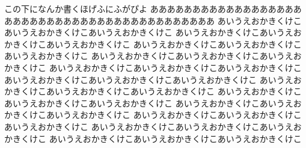 \documentclass[uplatex,dvipdfmx,ja=standard,a4paper]{bxjsarticle}
\begin{document}
この下になんか書くほげふにふがぴよ
ああああああああああああああああああ
あああああああああああああああああああああああああ
あいうえおかきくけこあいうえおかきくけこあいうえおかきくけこ
あいうえおかきくけこあいうえおかきくけこあいうえおかきくけこ
あいうえおかきくけこあいうえおかきくけこあいうえおかきくけこ
あいうえおかきくけこあいうえおかきくけこあいうえおかきくけこ
あいうえおかきくけこあいうえおかきくけこあいうえおかきくけこ
あいうえおかきくけこあいうえおかきくけこあいうえおかきくけこ
あいうえおかきくけこあいうえおかきくけこあいうえおかきくけこ
あいうえおかきくけこあいうえおかきくけこあいうえおかきくけこ
あいうえおかきくけこあいうえおかきくけこあいうえおかきくけこ
あいうえおかきくけこあいうえおかきくけこあいうえおかきくけこ
あいうえおかきくけこあいうえおかきくけこあいうえおかきくけこ
あいうえおかきくけこあいうえおかきくけこあいうえおかきくけこ
\end{document}

